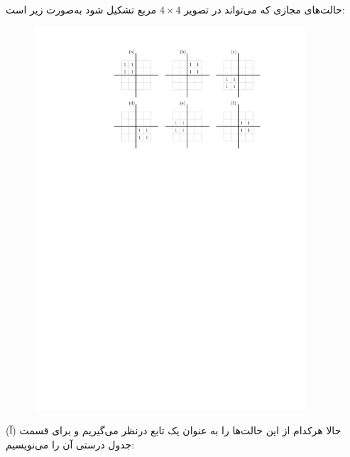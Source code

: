 حالت‌های مجازی که می‌تواند در تصویر $4\times 4 $ مربع تشکیل شود به‌صورت زیر است:


\begin{figure}[h]
	\centering
	\includegraphics[width=0.9\textwidth]{fig/Q_bunos_1.pdf}
	\label{img7_b}
\end{figure}


حالا هرکدام از این حالت‌ها را به عنوان یک تابع درنظر می‌گیریم و برای قسمت (آ) جدول درستی آن را می‌نویسیم:



